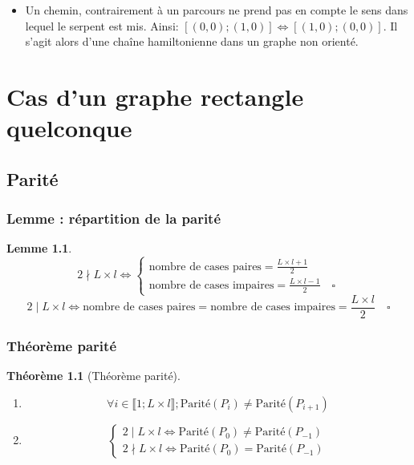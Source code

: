 \documentclass[twoside, a4paper, 12pt]{report}
\newtheorem*{lemma}{Lemme} %
\newtheorem{theorem}{Théorème}[chapter]
\newcommand{\subcqfd}[1][\quad]{\ensuremath{#1\square}}
\newcommand{\parite}[1]{\ensuremath{\text{Parité}(#1)}}
\begin{document}
\begin{itemize}
\item Un chemin, contrairement à un parcours ne prend pas en compte le sens dans lequel le serpent est mis. Ainsi: $[(0,0); (1,0)] \Leftrightarrow [(1,0) ; (0,0)]$. Il s'agit alors d'une chaîne hamiltonienne dans un graphe non orienté.
\end{itemize}


\chapter{Cas d'un graphe rectangle quelconque}
\section{Parité}
\subsection{Lemme : répartition de la parité}

\begin{lemma}
 \[
2 \nmid L \times l \Leftrightarrow
\left\{
    \begin{array}{ll}
        \text{nombre de cases paires} = \frac{L \times l + 1}{2}\\
        \text{nombre de cases impaires} = \frac{L \times l - 1}{2} \subcqfd
    \end{array}
\right.
\]
 \[
2 \mid L \times l \Leftrightarrow \text{nombre de cases paires} = \text{nombre de cases impaires} = \frac{L \times l }{2} \subcqfd
\]
\end{lemma}

\subsection{Théorème parité}

\begin{theorem}[Théorème parité] \label{theoreme_parite}
\begin{enumerate}\ \\
\item \label{prop_changement_parite}
\[ \forall i \in \llbracket 1; L \times l \rrbracket; \parite{P_i} \not = \parite{P_{i+1}} \] 
\item 
\[
\left\{
    \begin{array}{ll}
        2 \mid L \times l \Leftrightarrow \parite{P_0} \not= \parite{P_{-1}}\\
        2 \nmid L \times l \Leftrightarrow \parite{P_0} = \parite{P_{-1}}
    \end{array}
\right.
\]
\end{enumerate}
\end{theorem}
\end{document}

